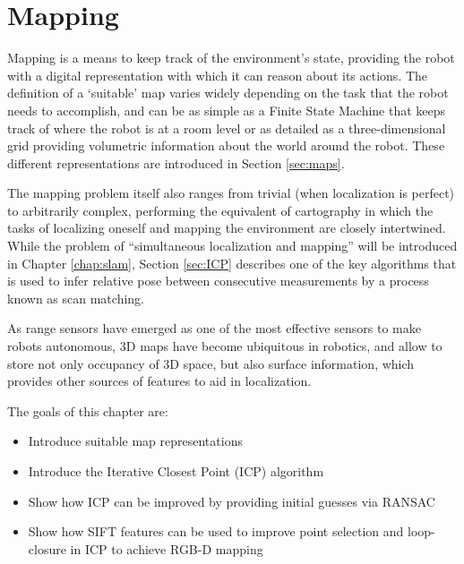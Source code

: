 \chapter{Mapping}\label{chap:mapping}
Mapping is a means to keep track of the environment's state, providing the robot with a digital representation with which it can reason about its actions. The definition of a `suitable' map varies widely depending on the task that the robot needs to accomplish, and can be as simple as a Finite State Machine that keeps track of where the robot is at a room level or as detailed as a three-dimensional grid providing volumetric information about the world around the robot. These different representations are introduced in Section \ref{sec:maps}.

The mapping problem itself also ranges from trivial (when localization is perfect) to arbitrarily complex, performing the equivalent of cartography in which the tasks of localizing oneself and mapping the environment are closely intertwined. While the problem of ``simultaneous localization and mapping'' will be introduced in Chapter \ref{chap:slam}, Section \ref{sec:ICP} describes one of the key algorithms that is used to infer relative pose between consecutive measurements by a process known as scan matching. 

As range sensors have emerged as one of the most effective sensors to make robots autonomous, 3D maps have become ubiquitous in robotics, and allow to store not only occupancy of 3D space, but also surface information, which provides other sources of features to aid in localization.   

The goals of this chapter are:

\begin{itemize}
	\item Introduce suitable map representations
    \item Introduce the Iterative Closest Point (ICP) algorithm
    \item Show how ICP can be improved by providing initial guesses via RANSAC
    \item Show how SIFT features can be used to improve point selection and loop-closure in ICP to achieve RGB-D mapping
\end{itemize}



